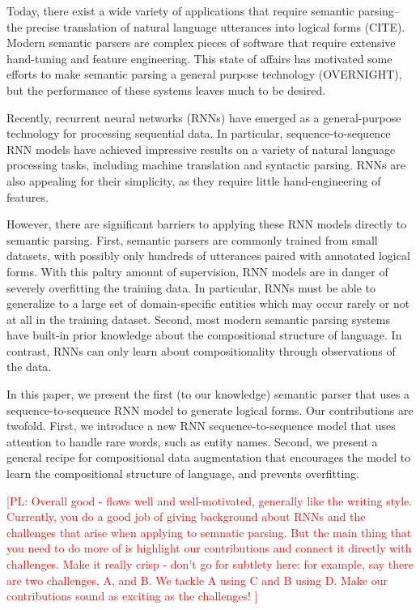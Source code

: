 \documentclass[11pt,letterpaper]{article}
\newcommand\pl[1]{\textcolor{red}{[PL: #1]}}
\begin{document}
Today, there exist a wide variety of applications that 
require semantic parsing--the precise translation of
natural language utterances into logical forms (CITE).
Modern semantic parsers are complex pieces of software
that require extensive hand-tuning and feature engineering.
This state of affairs has motivated some efforts
to make semantic parsing a general purpose technology (OVERNIGHT),
but the performance of these systems leaves much to be desired.

Recently, recurrent neural networks (RNNs) have emerged
as a general-purpose technology for processing sequential data.
In particular, sequence-to-sequence RNN models
have achieved impressive results on a variety of natural language processing
tasks, including machine translation and syntactic parsing.
RNNs are also appealing for their simplicity, as they require 
little hand-engineering of features.

However, there are significant barriers to applying these 
RNN models directly to semantic parsing.
First, semantic parsers are commonly trained from small datasets,
with possibly only hundreds of utterances paired with annotated logical forms.
With this paltry amount of supervision,
RNN models are in danger of severely overfitting the training data.
In particular, RNNs must be able to generalize to a large set of
domain-specific entities which may occur rarely or not at all
in the training dataset.
Second, most modern semantic parsing systems have built-in
prior knowledge about the compositional structure of language.
In contrast, RNNs can only learn about compositionality
through observations of the data.

In this paper, we present the first (to our knowledge)
semantic parser that uses a sequence-to-sequence RNN model to generate
logical forms.  
Our contributions are twofold.
First, we introduce a new RNN sequence-to-sequence model that uses 
attention to handle rare words, such as entity names.
Second, we present a general recipe
for compositional data augmentation that encourages 
the model to learn the compositional structure of language, 
and prevents overfitting.

\pl{
Overall good - flows well and well-motivated, generally like the writing style.
Currently, you do a good job of giving background about RNNs
and the challenges that arise when applying to semnatic parsing.
But the main thing that you need to do more of is highlight our contributions
and connect it directly with challenges.
Make it really crisp - don't go for subtlety here: for example,
say there are two challenges, A, and B.  We tackle A using C and B using D.
Make our contributions sound as exciting as the challenges!
}
\end{document}
